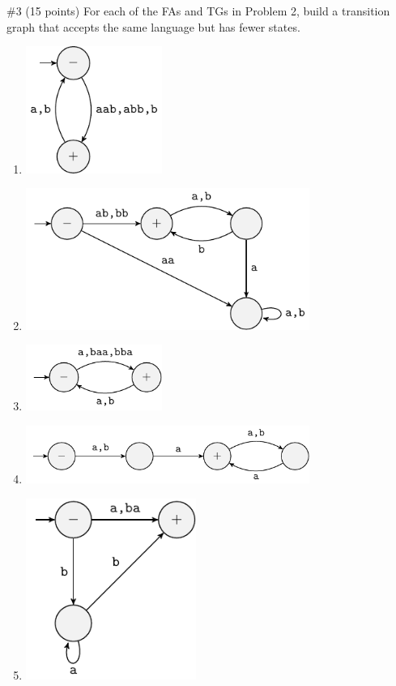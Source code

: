 \begin{problem}{\#3 (15 points)}
    For each of the FAs and TGs in Problem 2, build a transition graph that accepts the same language but has fewer states.
\end{problem}
\vspace{2em}
\begin{solution}
    \begin{enumerate}[label=\textbf{\alph*)}]
        \item \includegraphics[width=12em]{figures/answer/Answer3-A.pdf}
        \item \includegraphics[width=25em]{figures/answer/Answer3-B.pdf}
        \item \includegraphics[width=12em]{figures/answer/Answer3-C.pdf}
        \item \includegraphics[width=25em]{figures/answer/Answer3-D.pdf}
        \item \includegraphics[width=15em]{figures/answer/Answer3-E.pdf}
    \end{enumerate}
\end{solution}